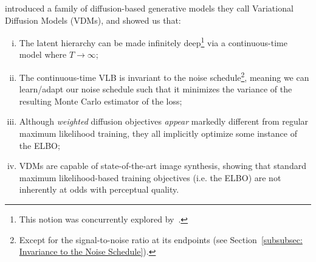 \cite{kingma2021variational,kingma2023understanding} introduced a family of diffusion-based generative models they call Variational Diffusion Models (VDMs), and showed us that: 
%
\begin{enumerate}[(i)]
    \item The latent hierarchy can be made infinitely deep\footnote{This notion was concurrently explored by~\cite{song2021scorebased,huang2021variational,vahdat2021score}.} via a continuous-time model where $T \to \infty$; 
    \item The continuous-time VLB is invariant to the noise schedule\footnote{Except for the signal-to-noise ratio at its endpoints (see Section~\ref{subsubsec: Invariance to the Noise Schedule}).}, meaning we can learn/adapt our noise schedule such that it minimizes the variance of the resulting Monte Carlo estimator of the loss;
    \item Although \textit{weighted} diffusion objectives \textit{appear} markedly different from regular maximum likelihood training, they all implicitly optimize some instance of the ELBO;
    \item VDMs are capable of state-of-the-art image synthesis, showing that standard maximum likelihood-based training objectives (i.e. the ELBO) are not inherently at odds with perceptual quality.
\end{enumerate}

